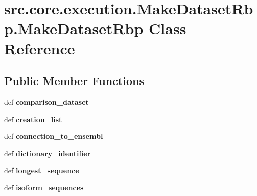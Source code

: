 \hypertarget{classsrc_1_1core_1_1execution_1_1MakeDatasetRbp_1_1MakeDatasetRbp}{\section{src.\-core.\-execution.\-Make\-Dataset\-Rbp.\-Make\-Dataset\-Rbp Class Reference}
\label{classsrc_1_1core_1_1execution_1_1MakeDatasetRbp_1_1MakeDatasetRbp}
}
\subsection*{Public Member Functions}
\begin{DoxyCompactItemize}
\item 
\hypertarget{classsrc_1_1core_1_1execution_1_1MakeDatasetRbp_1_1MakeDatasetRbp_a41fccbe107fd4affee8d04b7c4476dae}{def {\bfseries comparison\-\_\-dataset}}\label{classsrc_1_1core_1_1execution_1_1MakeDatasetRbp_1_1MakeDatasetRbp_a41fccbe107fd4affee8d04b7c4476dae}

\item 
\hypertarget{classsrc_1_1core_1_1execution_1_1MakeDatasetRbp_1_1MakeDatasetRbp_a4f0dae78969501e102ff7d141dd0e4a2}{def {\bfseries creation\-\_\-list}}\label{classsrc_1_1core_1_1execution_1_1MakeDatasetRbp_1_1MakeDatasetRbp_a4f0dae78969501e102ff7d141dd0e4a2}

\item 
\hypertarget{classsrc_1_1core_1_1execution_1_1MakeDatasetRbp_1_1MakeDatasetRbp_ac0de547a0ac56c8dfa4a30df453b7c1f}{def {\bfseries connection\-\_\-to\-\_\-ensembl}}\label{classsrc_1_1core_1_1execution_1_1MakeDatasetRbp_1_1MakeDatasetRbp_ac0de547a0ac56c8dfa4a30df453b7c1f}

\item 
\hypertarget{classsrc_1_1core_1_1execution_1_1MakeDatasetRbp_1_1MakeDatasetRbp_a1b8e836be9cb0ee2ddc598a4ffda57cc}{def {\bfseries dictionary\-\_\-identifier}}\label{classsrc_1_1core_1_1execution_1_1MakeDatasetRbp_1_1MakeDatasetRbp_a1b8e836be9cb0ee2ddc598a4ffda57cc}

\item 
\hypertarget{classsrc_1_1core_1_1execution_1_1MakeDatasetRbp_1_1MakeDatasetRbp_aa33e4ce52dd1f1c29b129f07fa0f06d5}{def {\bfseries longest\-\_\-sequence}}\label{classsrc_1_1core_1_1execution_1_1MakeDatasetRbp_1_1MakeDatasetRbp_aa33e4ce52dd1f1c29b129f07fa0f06d5}

\item 
\hypertarget{classsrc_1_1core_1_1execution_1_1MakeDatasetRbp_1_1MakeDatasetRbp_a0525c07bb38cb39454a123caff306c4c}{def {\bfseries isoform\-\_\-sequences}}\label{classsrc_1_1core_1_1execution_1_1MakeDatasetRbp_1_1MakeDatasetRbp_a0525c07bb38cb39454a123caff306c4c}


\end{DoxyCompactItemize}
